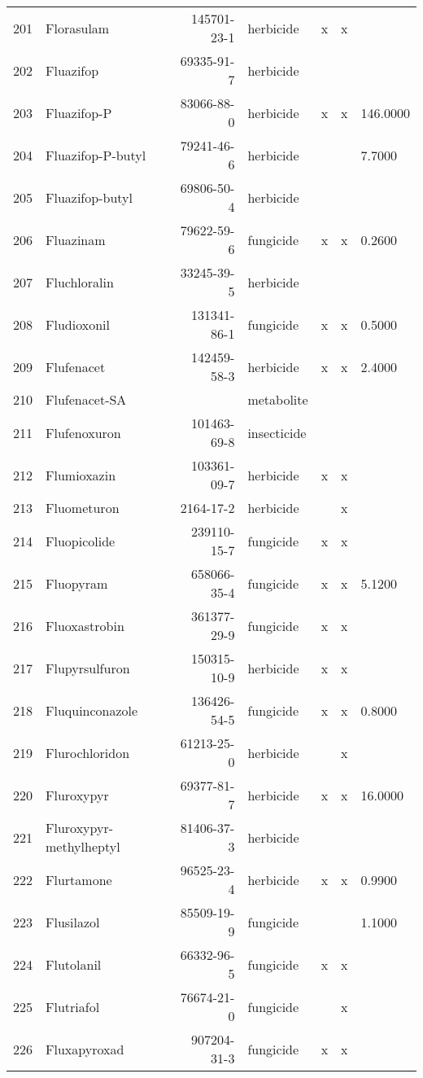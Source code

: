 \begin{longtable}{lp{4cm}rlp{1.3cm}p{1.3cm}p{1.5cm}}
  201 & Florasulam & 145701-23-1 & herbicide & x & x &  \\ 
  202 & Fluazifop & 69335-91-7 & herbicide &  &  &  \\ 
  203 & Fluazifop-P & 83066-88-0 & herbicide & x & x & 146.0000 \\ 
  204 & Fluazifop-P-butyl & 79241-46-6 & herbicide &  &  & 7.7000 \\ 
  205 & Fluazifop-butyl & 69806-50-4 & herbicide &  &  &  \\ 
  206 & Fluazinam & 79622-59-6 & fungicide & x & x & 0.2600 \\ 
  207 & Fluchloralin & 33245-39-5 & herbicide &  &  &  \\ 
  208 & Fludioxonil & 131341-86-1 & fungicide & x & x & 0.5000 \\ 
  209 & Flufenacet & 142459-58-3 & herbicide & x & x & 2.4000 \\ 
  210 & Flufenacet-SA &  & metabolite &  &  &  \\ 
  211 & Flufenoxuron & 101463-69-8 & insecticide &  &  &  \\ 
  212 & Flumioxazin & 103361-09-7 & herbicide & x & x &  \\ 
  213 & Fluometuron & 2164-17-2 & herbicide &  & x &  \\ 
  214 & Fluopicolide & 239110-15-7 & fungicide & x & x &  \\ 
  215 & Fluopyram & 658066-35-4 & fungicide & x & x & 5.1200 \\ 
  216 & Fluoxastrobin & 361377-29-9 & fungicide & x & x &  \\ 
  217 & Flupyrsulfuron & 150315-10-9 & herbicide & x & x &  \\ 
  218 & Fluquinconazole & 136426-54-5 & fungicide & x & x & 0.8000 \\ 
  219 & Flurochloridon & 61213-25-0 & herbicide &  & x &  \\ 
  220 & Fluroxypyr & 69377-81-7 & herbicide & x & x & 16.0000 \\ 
  221 & Fluroxypyr-methylheptyl & 81406-37-3 & herbicide &  &  &  \\ 
  222 & Flurtamone & 96525-23-4 & herbicide & x & x & 0.9900 \\ 
  223 & Flusilazol & 85509-19-9 & fungicide &  &  & 1.1000 \\ 
  224 & Flutolanil & 66332-96-5 & fungicide & x & x &  \\ 
  225 & Flutriafol & 76674-21-0 & fungicide &  & x &  \\ 
  226 & Fluxapyroxad & 907204-31-3 & fungicide & x & x &  \\ 

\end{longtable}
